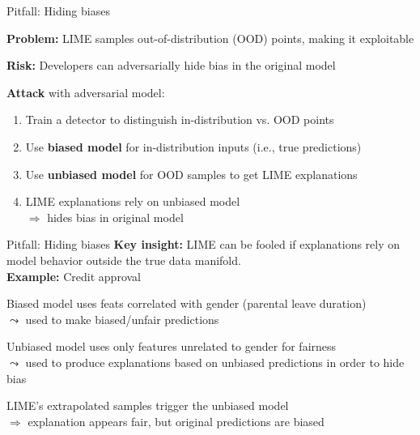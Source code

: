 \documentclass[10pt,compress,t,notes=noshow, xcolor=table]{beamer}
\begin{document}
\begin{framev}[align=top]{Pitfall: Hiding biases }
\begin{itemizeM}
\item \textbf{Problem:} LIME samples out-of-distribution (OOD) points, making it exploitable
\item \textbf{Risk:} Developers can adversarially hide bias in the original model
\pause
\item \textbf{Attack} with adversarial model:
\end{itemizeM}
\begin{enumerate}
\item Train a detector to distinguish in-distribution vs. OOD points
\item Use \textbf{biased model} for in-distribution inputs (i.e., true predictions)
\item Use \textbf{unbiased model} for OOD samples to get LIME explanations
\item[$\leadsto$] LIME explanations rely on unbiased model\\
$\Rightarrow$ hides bias in original model
\end{enumerate}
\end{framev}


\begin{framev}[align=top]{Pitfall: Hiding biases }
\textbf{Key insight:} LIME can be fooled if explanations rely on model behavior outside the true data manifold.\\
\spacer[0.25]
\textbf{Example:} Credit approval
\begin{itemizeM}
\item Biased model uses feats correlated with gender (parental leave duration)\\
$\leadsto$ used to make biased/unfair predictions
\item Unbiased model uses only features unrelated to gender for fairness\\%
$\leadsto$ used to produce explanations based on unbiased predictions in order to hide bias
\item LIME’s extrapolated samples trigger the unbiased model\\
$\Rightarrow$ explanation appears fair, but original predictions are biased
\end{itemizeM}
\end{framev}
\end{document}
